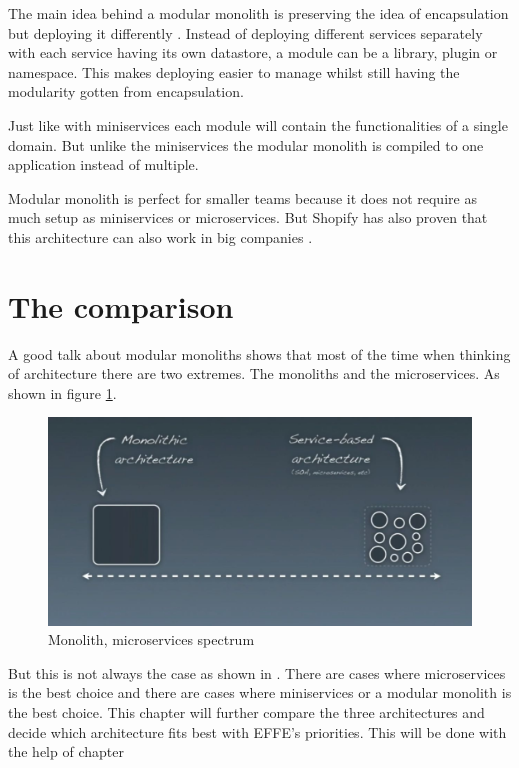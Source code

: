 The main idea behind a modular monolith is preserving the idea of encapsulation but deploying it differently \cite{modularMonolithIdea}. Instead of deploying different services separately with each service having its own datastore, a module can be a library, plugin or namespace. This makes deploying easier to manage whilst still having the modularity gotten from encapsulation.

Just like with miniservices each module will contain the functionalities of a single domain. But unlike the miniservices the modular monolith is compiled to one application instead of multiple.

Modular monolith is perfect for smaller teams because it does not require as much setup as miniservices or microservices. But Shopify has also proven that this architecture can also work in big companies \cite{shopifyModularMonolith}.

\section{The comparison}
\label{sec:Comparison}

A good talk about modular monoliths \cite{modularMonolithTalk} shows that most of the time when thinking of architecture there are two extremes. The monoliths and the microservices. As shown in figure \ref{fig:MonolithMicroservicesSpectrum}.
\begin{figure}[H]
	\includegraphics[width=\linewidth]{microservices-spectrum.png}
        \caption{Monolith, microservices spectrum \cite{modularMonolithTalk}}
        \label{fig:MonolithMicroservicesSpectrum}
\end{figure}

But this is not always the case as shown in . There are cases where microservices is the best choice and there are cases where miniservices or a modular monolith is the best choice. This chapter will further compare the three architectures and decide which architecture fits best with EFFE's priorities. This will be done with the help of chapter 

